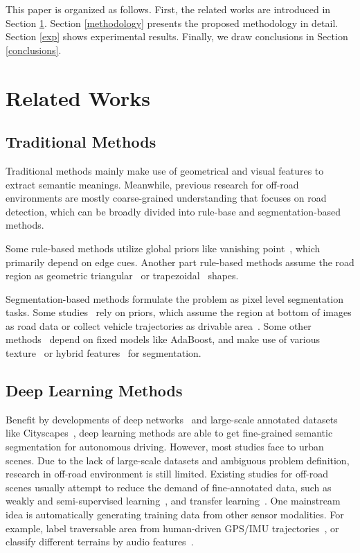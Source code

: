 \documentclass[letterpaper, 10 pt, conference]{ieeeconf}  %
\begin{document}
This paper is organized as follows. First, the related works
are introduced in Section \ref{related_works}. Section \ref{methodology} presents the proposed methodology in detail. Section \ref{exp} shows experimental results. Finally, we draw conclusions in Section \ref{conclusions}.

\section{Related Works} \label{related_works}
\subsection{Traditional Methods}
Traditional methods mainly make use of geometrical and visual features to extract semantic meanings. Meanwhile, previous research for off-road environments are mostly coarse-grained understanding that focuses on road detection, which can be broadly divided into rule-base and segmentation-based methods.

Some rule-based methods utilize global priors like vanishing point~\cite{kong2009vanishing}\cite{shi2015fast}, which primarily depend on edge cues. Another part rule-based methods assume the road region as geometric triangular~\cite{zhou2010self} or trapezoidal~\cite{ososinski2015automatic}\cite{jeong2002vision} shapes.

Segmentation-based methods formulate the problem as pixel level segmentation tasks. Some studies~\cite{lu2014hierarchical}\cite{dahlkamp2006self} rely on priors, which assume the region at bottom of images as road data or collect vehicle trajectories as drivable area~\cite{mei2017scene}.
Some other methods~\cite{alon2006off}\cite{wang2009unstructured} depend on fixed models like AdaBoost, and make use of various texture~\cite{alon2006off} or hybrid features~\cite{wang2009unstructured} for segmentation.

\subsection{Deep Learning Methods}
Benefit by developments of deep networks~\cite{long2015fully} and large-scale annotated datasets like Cityscapes~\cite{cordts2016cityscapes}, deep learning methods are able to get fine-grained semantic segmentation for autonomous driving. However, most studies face to urban scenes. Due to the lack of large-scale datasets and ambiguous problem definition, research in off-road environment is still limited.
Existing studies for off-road scenes usually attempt to reduce the demand of fine-annotated data, such as weakly and semi-supervised learning~\cite{suger2015traversability}\cite{gao2019off}, and transfer learning~\cite{sharma2019semantic}\cite{tang2017one}. One mainstream idea is automatically generating training data from other sensor modalities. For example, label traversable area from human-driven GPS/IMU trajectories~\cite{suger2015traversability}\cite{gao2019off}, or classify different terrains by audio features~\cite{zurn2020self}.
\end{document}
